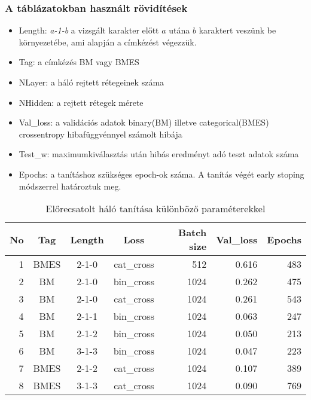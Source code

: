 \documentclass[a4paper, magyar]{article}
\begin{document}
\subsubsection{A táblázatokban használt rövidítések}
\begin{itemize}
	\item Length: \textit{a-1-b} a vizsgált karakter előtt $a$ utána $b$ karaktert veszünk be környezetébe, ami alapján a címkézést végezzük.
	\item Tag: a címkézés BM vagy BMES
	\item NLayer: a háló rejtett rétegeinek száma
	\item NHidden: a rejtett rétegek mérete
	\item Val\_loss: a validációs adatok binary(BM) illetve categorical(BMES) crossentropy hibafüggvénnyel számolt hibája
	\item Test\_w: maximumkiválasztás után hibás eredményt adó teszt adatok száma
	\item Epochs: a tanításhoz szükséges epoch-ok száma. A tanítás végét early stoping módszerrel határoztuk meg.
\end{itemize}
\begin{table}[htp]\centering
	\begin{tabular}{|r|c|c|c|r|r|r|}
		\hline
		No&Tag&Length&Loss&Batch size&Val\_loss&Epochs\\
		\hline\hline
		1&BMES&2-1-0&cat\_cross&512&0.616&483\\ 
		\hline
		2&BM&2-1-0&bin\_cross&1024&0.262&475\\
		\hline
		3&BM&2-1-0&cat\_cross&1024&0.261&543\\
		\hline
		4&BM&2-1-1&bin\_cross&1024&0.063&247\\
		\hline
		5&BM&2-1-2&bin\_cross&1024&0.050&213\\
		\hline
		6&BM&3-1-3&bin\_cross&1024&0.047&223\\
		\hline
		7&BMES&2-1-2&cat\_cross&1024&0.107&389\\
		\hline
		8&BMES&3-1-3&cat\_cross&1024&0.090&769\\
		\hline
	\end{tabular}
	\caption{Előrecsatolt háló tanítása különböző paraméterekkel}
	\label{tab:firstlearn}
\end{table}
\end{document}

